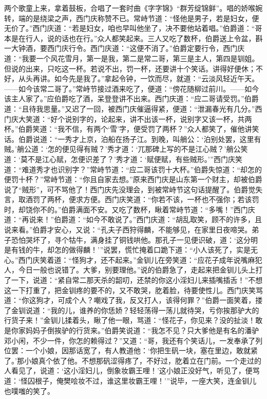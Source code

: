 两个歌童上来，拿着鼓板，合唱了一套时曲《字字锦》“群芳绽锦鲜”。唱的娇喉婉转，端的是绕梁之声，西门庆称赞不已。常峙节道：“怪他是男子，若是妇女，便无价了。”西门庆道：“若是妇女，咱也早叫他坐了，决不要他站着唱。”伯爵道：“哥本是在行人，说的话也在行。”众人都笑起来。三人又吃了数杯，伯爵送上令盆，斟一大钟酒，要西门庆行令。西门庆道：“这便不消了。”伯爵定要行令，西门庆道：“我要一个风花雪月，第一是我，第二是常二哥，第三是主人，第四是钏姐。但说的出来，只吃这一杯。若说不出，罚一杯，还要讲十个笑话。讲得好便休；不好，从头再讲。如今先是我了。”拿起令钟，一饮而尽，就道：“云淡风轻近午天。——如今该常二哥了。”常峙节接过酒来吃了，便道：“傍花随柳过前川。——如今该主人家了。”应伯爵吃了酒，呆登登讲不出来。西门庆道：“应二哥请受罚。”伯爵道：“且待我思量。”又迟了一回，被西门庆催逼得紧，便道：“泄漏春光有几分。”西门庆大笑道：“好个说别字的，论起来，讲不出该一杯，说别字又该一杯，共两杯。”伯爵笑道：“我不信，有两个‘雪’字，便受罚了两杯？”众人都笑了，催他讲笑话。伯爵说道：“一秀才上京，泊船在扬子江。到晚，叫艄公：‘泊别处罢，这里有贼。’艄公道：‘怎的便见得有贼？’秀才道：‘兀那碑上写的不是江心贼？’艄公笑道：‘莫不是江心赋，怎便识差了？’秀才道：‘赋便赋，有些贼形。’”西门庆笑道：“难道秀才也识别字？”常峙节道：“应二哥该罚十大杯。”伯爵失惊道：“却怎的便罚十杯？”常峙节道：“你且自家去想。”原来西门庆是山东第一个财主，却被伯爵说了“贼形”，可不骂他了！西门庆先没理会，到被常峙节这句话提醒了。伯爵觉失言，取酒罚了两杯，便求方便。西门庆笑道：“你若不该，一杯也不强你；若该罚时，却饶你不的。”伯爵满面不安。又吃了数杯，瞅着常峙节道：“多嘴！”西门庆道：“再说来！”伯爵道：“如今不敢说了。”西门庆道：“胡乱取笑，顾不的许多，且说来看。”伯爵才安心，又说：“孔夫子西狩得麟，不能够见，在家里日夜啼哭。弟子恐怕哭坏了，寻个牯牛，满身挂了铜钱哄他。那孔子一见便识破，道：‘这分明是有钱的牛，却怎的做得麟！’”说罢，慌忙掩着口跪下道：“小人该死了，实是无心。”西门庆笑着道：“怪狗才，还不起来。”金钏儿在旁笑道：“应花子成年说嘴麻犯人，今日一般也说错了。大爹，别要理他。”说的伯爵急了，走起来把金钏儿头上打了一下，说道：“紧自常二那天杀的韶叨，还禁的你这小淫妇儿来插嘴插舌！”不想这一下打重了，把金钏疼的要不的，又不敢哭，肐\textYueChou 着脸，待要使性儿。西门庆笑骂道：“你这狗才，可成个人？嘲戏了我，反又打人，该得何罪？”伯爵一面笑着，搂了金钏说道：“我的儿，谁养的你恁娇？轻轻荡得一荡儿就待哭，亏你挨那驴大的行货子来！”金钏儿揉着头，瞅了他一眼，骂道：“怪花子，你见来？没的扯淡！敢是你家妈妈子倒挨驴的行货来。”伯爵笑说道：“我怎不见？只大爹他是有名的潘驴邓小闲，不少一件，你怎的赖得过？”又道：“哥，我还有个笑话儿，一发奉承了列位罢：一个小娘，因那话宽了，有人教道他：‘你把生矾一块，塞在里边，敢就紧了。’那小娘真个依了他。不想那矾涩得疼了，不好过，肐\textYueChou 着立在门前。一个走过的人看见了，说道：‘这小淫妇儿，倒象妆霸王哩！’这小娘正没好气，听见了，便骂道：‘怪囚根子，俺樊哙妆不过，谁这里妆霸王哩！’”说毕，一座大笑，连金钏儿也噗嗤的笑了。

